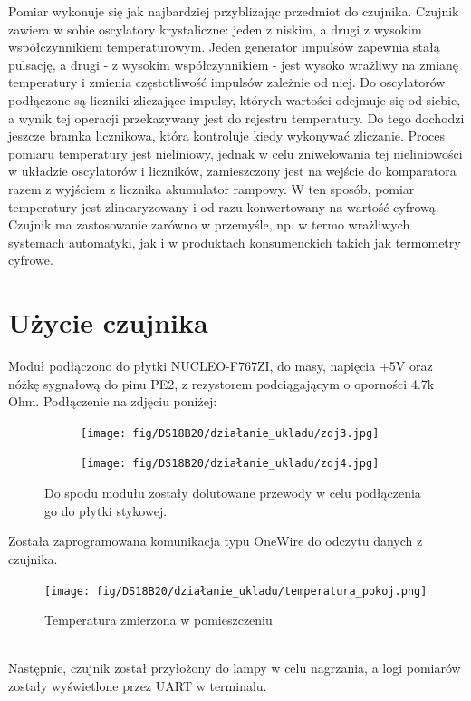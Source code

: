 \documentclass[11pt, a4paper]{article}
\begin{document}
Pomiar wykonuje się jak najbardziej przybliżając przedmiot do czujnika. Czujnik zawiera w sobie oscylatory krystaliczne: jeden z niskim, a drugi z wysokim współczynnikiem temperaturowym. Jeden generator impulsów zapewnia stałą pulsację, a drugi - z wysokim współczynnikiem - jest wysoko wrażliwy na zmianę temperatury i zmienia częstotliwość impulsów zależnie od niej. Do oscylatorów podłączone są liczniki zliczające impulsy, których wartości odejmuje się od siebie, a wynik tej operacji przekazywany jest do rejestru temperatury. Do tego dochodzi jeszcze bramka licznikowa, która kontroluje kiedy wykonywać zliczanie. Proces pomiaru temperatury jest nieliniowy, jednak w celu zniwelowania tej nieliniowości w układzie oscylatorów i liczników, zamieszczony jest na wejście do komparatora razem z wyjściem z licznika akumulator rampowy. W ten sposób, pomiar temperatury jest zlinearyzowany i od razu konwertowany na wartość cyfrową. \\
Czujnik ma zastosowanie zarówno w przemyśle, np. w termo wrażliwych systemach automatyki, jak i w produktach konsumenckich takich jak termometry cyfrowe. 



\section{Użycie czujnika}

Moduł podłączono do płytki NUCLEO-F767ZI, do masy, napięcia +5V oraz nóżkę sygnałową do pinu PE2, z rezystorem podciągającym o oporności 4.7k Ohm. Podłączenie na zdjęciu poniżej: 
\begin{figure}[h]
\begin{subfigure}{.5\textwidth}
\centering
\texttt{[image: fig/DS18B20/działanie\_ukladu/zdj3.jpg]}
\label{fig:_zdjecie_elementu}
\end{subfigure}%
\begin{subfigure}{.5\textwidth}
\centering
\texttt{[image: fig/DS18B20/działanie\_ukladu/zdj4.jpg]}
\label{fig:_zasada_dzialania_elementu}
\end{subfigure}
\caption{Do spodu modułu zostały dolutowane przewody w celu podłączenia go do płytki stykowej.}
\end{figure}

Została zaprogramowana komunikacja typu OneWire do odczytu danych z czujnika.
\begin{figure}[h]
\centering
\texttt{[image: fig/DS18B20/działanie\_ukladu/temperatura\_pokoj.png]}
\label{fig:_zdjecie_elementu}
\caption{Temperatura zmierzona w pomieszczeniu}
\end{figure}
\\
Następnie, czujnik został przyłożony do lampy w celu nagrzania, a logi pomiarów zostały wyświetlone przez UART w terminalu. 
\end{document}
